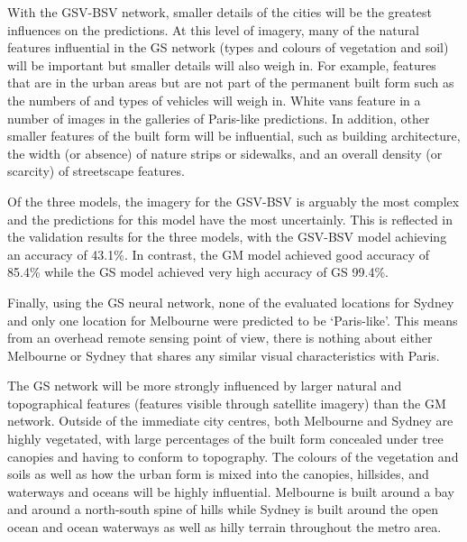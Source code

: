\documentclass[10pt,letterpaper]{article}
\begin{document}
With the GSV-BSV network, smaller details of the cities will be the greatest influences on the predictions. At this level of imagery, many of the natural features influential in the GS network (types and colours of vegetation and soil) will be important but smaller details will also weigh in. For example, features that are in the urban areas but are not part of the permanent built form such as the numbers of and types of vehicles will weigh in. White vans feature in a number of images in the galleries of Paris-like predictions. In addition, other smaller features of the built form will be influential, such as building architecture, the width (or absence) of nature strips or sidewalks, and an overall density (or scarcity) of streetscape features. 

Of the three models, the imagery for the GSV-BSV is arguably the most complex and the predictions for this model have the most uncertainly. This is reflected in the validation results for the three models, with the GSV-BSV model achieving an accuracy of 43.1\%. In contrast, the GM model achieved good accuracy of 85.4\% while the GS model achieved very high accuracy of GS 99.4\%.



%

Finally, using the GS neural network, none of the evaluated locations for Sydney and only one location for Melbourne were predicted to be `Paris-like'. This means from an overhead remote sensing point of view, there is nothing about either Melbourne or Sydney that shares any similar visual characteristics with Paris.

The GS network will be more strongly influenced by larger natural and topographical features (features visible through satellite imagery) than the GM network. Outside of the immediate city centres, both Melbourne and Sydney are highly vegetated, with large percentages of the built form concealed under tree canopies and having to conform to topography. The colours of the vegetation and soils as well as how the urban form is mixed into the canopies, hillsides, and waterways and oceans will be highly influential. Melbourne is built around a bay and around a north-south spine of hills while Sydney is built around the open ocean and ocean waterways as well as hilly terrain throughout the metro area.
\end{document}

